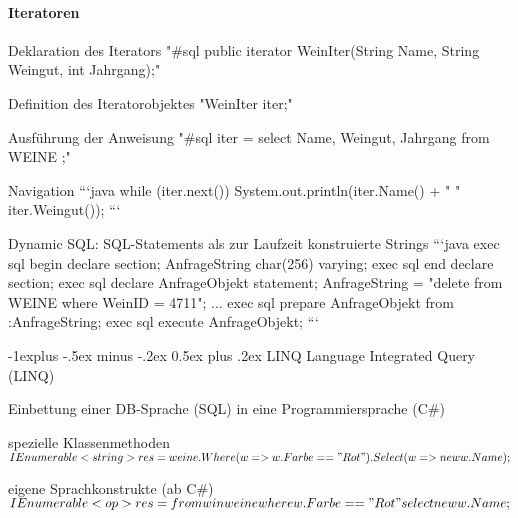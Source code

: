 \documentclass[a4paper]{article}
\makeatletter
\renewcommand{\subsection}{\@startsection{subsection}{2}{0mm}%
                                {-1explus -.5ex minus -.2ex}%
                                {0.5ex plus .2ex}%
                                {\normalfont\normalsize\bfseries}}
\makeatother
\begin{document}
\begin{multicols}{3}
    \paragraph{Iteratoren}
    \begin{enumerate*}
        \item Deklaration des Iterators "\#sql public iterator WeinIter(String Name, String Weingut, int Jahrgang);"
        \item Definition des Iteratorobjektes "WeinIter iter;"
        \item Ausführung der Anweisung "\#sql iter = { select Name, Weingut, Jahrgang from WEINE };"
        \item Navigation
        ```java
        while (iter.next()) {
                System.out.println(iter.Name() + " " iter.Weingut());
            }
        ```
    \end{enumerate*}

    Dynamic SQL: SQL-Statements als zur Laufzeit konstruierte Strings
    ```java
    exec sql begin declare section;
    AnfrageString char(256) varying;
    exec sql end declare section;
    exec sql declare AnfrageObjekt statement;
    AnfrageString = "delete from WEINE where WeinID = 4711";
    ...
    exec sql prepare AnfrageObjekt from :AnfrageString;
    exec sql execute AnfrageObjekt;
    ```

    \subsection{LINQ}
    Language Integrated Query (LINQ)
    \begin{itemize*}
        \item Einbettung einer DB-Sprache (SQL) in eine Programmiersprache (C\#)
        \item spezielle Klassenmethoden $IEnumerable<string> res = weine.Where(w => w.Farbe == "Rot").Select(w => new { w.Name });$
        \item eigene Sprachkonstrukte (ab C\#) $IEnumerable<op> res = from w in weine  where w.Farbe == "Rot"  select new { w.Name };$
    \end{itemize*}


\end{multicols}
\end{document}
